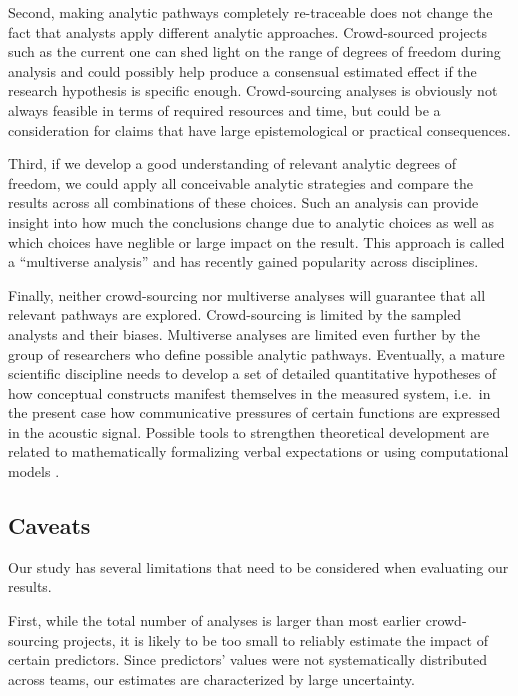 \documentclass[Review,times,sageh]{sagej}
\begin{document}
Second, making analytic pathways completely re-traceable does not change the fact that analysts apply different analytic approaches.
Crowd-sourced projects such as the current one can shed light on the range of degrees of freedom during analysis and could possibly help produce a consensual estimated effect if the research hypothesis is specific enough.
Crowd-sourcing analyses is obviously not always feasible in terms of required resources and time, but could be a consideration for claims that have large epistemological or practical consequences.

Third, if we develop a good understanding of relevant analytic degrees of freedom, we could apply all conceivable analytic strategies and compare the results across all combinations of these choices.
Such an analysis can provide insight into how much the conclusions change due to analytic choices as well as which choices have neglible or large impact on the result.
This approach is called a ``multiverse analysis'' \citep[e.g,][]{steegen2016increasing, harder2020multiverse} and has recently gained popularity across disciplines.

Finally, neither crowd-sourcing nor multiverse analyses will guarantee that all relevant pathways are explored.
Crowd-sourcing is limited by the sampled analysts and their biases.
Multiverse analyses are limited even further by the group of researchers who define possible analytic pathways.
Eventually, a mature scientific discipline needs to develop a set of detailed quantitative hypotheses of how conceptual constructs manifest themselves in the measured system, i.e.~in the present case how communicative pressures of certain functions are expressed in the acoustic signal.
Possible tools to strengthen theoretical development are related to mathematically formalizing verbal expectations or using computational models \citep[e.g.,][]{van2020formalizing, guest2021computational, scheel2021hypothesis, devezer2021case}.

\hypertarget{caveats}{%
\subsection{Caveats}\label{caveats}}

Our study has several limitations that need to be considered when evaluating our results.

First, while the total number of analyses is larger than most earlier crowd-sourcing projects, it is likely to be too small to reliably estimate the impact of certain predictors.
Since predictors' values were not systematically distributed across teams, our estimates are characterized by large uncertainty.
\end{document}
